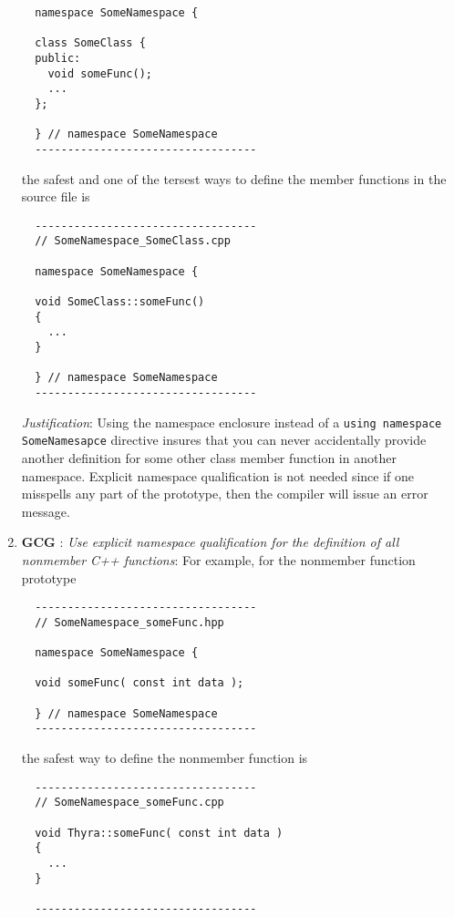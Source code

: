 \begin{enumerate}
{\begin{verbatim}
  namespace SomeNamespace {

  class SomeClass {
  public:
    void someFunc();
    ...
  };

  } // namespace SomeNamespace
  ----------------------------------
\end{verbatim}}

the safest and one of the tersest ways to define the member functions in the
source file is

{\small\begin{verbatim}
  ----------------------------------
  // SomeNamespace_SomeClass.cpp

  namespace SomeNamespace {

  void SomeClass::someFunc()
  {
    ...
  }

  } // namespace SomeNamespace
  ----------------------------------
\end{verbatim}}

{}\textit{Justification}: Using the namespace enclosure instead of a
{}\texttt{using namespace SomeNamesapce} directive insures that you can never
accidentally provide another definition for some other class member function
in another namespace.  Explicit namespace qualification is not needed since if
one misspells any part of the prototype, then the compiler will issue an error
message.

{}\item{}\textbf{GCG }:
{}\textit{Use explicit namespace qualification for the definition of all
nonmember C++ functions}: For example, for the nonmember function prototype

{\small\begin{verbatim}
  ----------------------------------
  // SomeNamespace_someFunc.hpp

  namespace SomeNamespace {

  void someFunc( const int data );

  } // namespace SomeNamespace
  ----------------------------------
\end{verbatim}}

the safest way to define the nonmember function is

{\small\begin{verbatim}
  ----------------------------------
  // SomeNamespace_someFunc.cpp

  void Thyra::someFunc( const int data )
  {
    ...
  }

  ----------------------------------
\end{verbatim}}


\end{enumerate}

